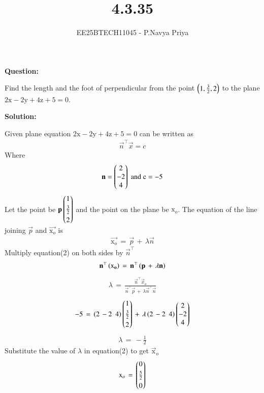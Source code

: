 \documentclass[journal,12pt,onecolumn]{IEEEtran}
\theoremstyle{remark}
\begin{document}
\title{4.3.35}
\author{EE25BTECH11045 - P.Navya Priya}
\maketitle
\renewcommand{\thefigure}{\theenumi}
\renewcommand{\thetable}{\theenumi}
\textbf{Question:}

Find the length and the foot of perpendicular from the point $\left(1,\frac{3}{2},2\right)$ to the plane $2\text{x}-2\text{y}+4\text{z}+5=0$.

\textbf{Solution:}

Given plane equation $2\text{x}-2\text{y}+4\text{z}+5=0$ can be written as 
\begin{align}
    \vec{n}^\top\vec{x}=c
\end{align}
Where
\begin{align*}
    \mathbf{n}=\begin{pmatrix}2\\-2\\4\end{pmatrix}\;\text{and}\;\text{c}=-5
\end{align*}
Let the point be $\mathbf{p}\begin{pmatrix}1\\[3pt]\frac{3}{2}\\[3pt]2\end{pmatrix}$ and the point on the plane be $\text{x}_o$. The equation of the line joining $\vec{p}$ and $\vec{\text{x}_o}$ is
\begin{align}
    \vec{\text{x}_o}\,=\,\vec{p}\,+\,\lambda\vec{n}
\end{align}
Multiply equation(2) on both sides by $\vec{n}^\top$
\begin{align}
\mathbf{n}^\top\left(\mathbf{\text{x}_o}\right)\,=\,\mathbf{n}^\top\left(\mathbf{p}\,+\,\lambda\mathbf{n}\right)
\end{align}
\begin{align}
\lambda\,=\,\frac{\vec{n}^\top\vec{x}_o}{\vec{n}^\top\vec{p}\,+\,\lambda\vec{n}^\top\vec{n}}
\end{align}
\begin{align}
    -5\,=\,\left(2\,-2\,\,\,4\right)\begin{pmatrix}1\\[3pt]\frac{3}{2}\\[3pt]2\end{pmatrix}\,+\,\lambda\left(2\,-2\,\,\,4\right)\begin{pmatrix}2\\-2\\4\end{pmatrix}
\end{align}
\begin{align}
    \lambda\,=\,-\frac{1}{2}
\end{align}
Substitute the value of $\lambda$ in equation(2) to get $\vec{\text{x}}_o$
\begin{align}
    \mathbf{\text{x}}_o\,=\,\begin{pmatrix}0\\[3pt]\frac{5}{2}\\[3pt]0\end{pmatrix}
\end{align}
\end{document}
